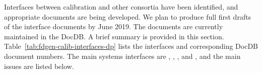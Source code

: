 Interfaces between calibration and other consortia have been identified, and appropriate documents are being developed. We plan to produce full first drafts of the interface documents by June 2019. The documents are currently maintained in the  DocDB. %
A brief summary is provided in this section. Table~\ref{tab:fdgen-calib-interfaces-dp} lists the 
interfaces and corresponding DocDB document numbers. 
The main systems interfaces are , , , and , and the main issues are listed below.


